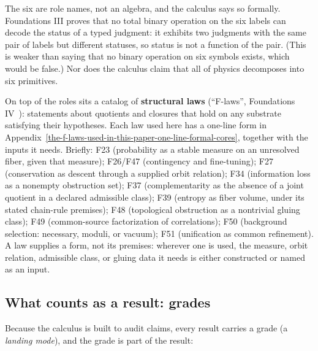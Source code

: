 The six are role names, not an algebra, and the calculus says so formally. Foundations III proves that no total binary
operation on the six labels can decode the status of a typed judgment: it exhibits two judgments with the same pair of
labels but different statuses, so status is not a function of the pair. (This is weaker than saying that no binary
operation on six symbols exists, which would be false.) Nor does the calculus claim that all of physics decomposes into
six primitives.

On top of the roles sits a catalog of \textbf{structural laws} (``F-laws'', Foundations
IV~\citep{Tsiokos_FoundationsIV}): statements about quotients and closures that hold on any substrate satisfying their
hypotheses. Each law used here has a one-line form in Appendix~\ref{the-f-laws-used-in-this-paper-one-line-formal-cores},
together with the inputs it needs. Briefly:
F23 (probability as a stable measure on an unresolved fiber, given that measure);
F26/F47 (contingency and fine-tuning);
F27 (conservation as descent through a supplied orbit relation);
F34 (information loss as a nonempty obstruction set);
F37 (complementarity as the absence of a joint quotient in a declared admissible class);
F39 (entropy as fiber volume, under its stated chain-rule premises);
F48 (topological obstruction as a nontrivial gluing class);
F49 (common-source factorization of correlations);
F50 (background selection: necessary, moduli, or vacuum);
F51 (unification as common refinement).
A law supplies a form, not its premises: wherever one is used, the measure, orbit relation, admissible class, or
gluing data it needs is either constructed or named as an input.

\subsection{What counts as a result: grades}\label{what-counts-as-a-result-landing-modes}

Because the calculus is built to audit claims, every result carries a grade (a \emph{landing mode}), and the grade
is part of the result:

